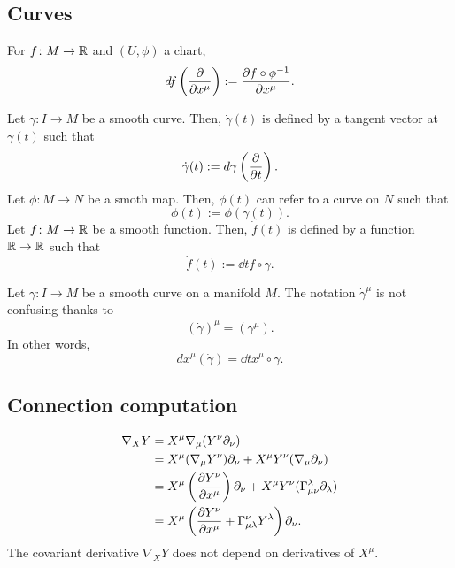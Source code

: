 \documentclass[11pt]{article}
\begin{document}
\subsection{Curves}

\begin{defn}
For $f\colon M\to\R$ and $(U,\phi)$ a chart,
\[df\left(\pd{x^\mu}\right):=\pd{f\circ\phi^{-1}}{x^\mu}.\]
\end{defn}



\begin{defn}
Let $\gamma\colon I\to M$ be a smooth curve.
Then, $\dot\gamma(t)$ is defined by a tangent vector at $\gamma(t)$ such that
\[\dot\gamma(t):=d\gamma\left(\pd{t}\right).\]
Let $\phi\colon M\to N$ be a smoth map.
Then, $\phi(t)$ can refer to a curve on $N$ such that
\[\phi(t):=\phi(\gamma(t)).\]
Let $f\colon M\to\R$ be a smooth function.
Then, $\dot f(t)$ is defined by a function $\R\to\R$ such that
\[\dot f(t):=\dd{t}f\circ\gamma.\]
\end{defn}

\begin{prop}
Let $\gamma\colon I\to M$ be a smooth curve on a manifold $M$.
The notation $\dot\gamma^\mu$ is not confusing thanks to
\[(\dot\gamma)^\mu=\dot{(\gamma^\mu)}.\]
In other words,
\[dx^\mu(\dot\gamma)=\dd{t}x^\mu\circ\gamma.\]
\end{prop}


\subsection{Connection computation}

\begin{align*}
\nabla_XY&=X^\mu\nabla_\mu(Y^\nu\pd_\nu)\\
&=X^\mu(\nabla_\mu Y^\nu)\pd_\nu+X^\mu Y^\nu(\nabla_\mu\pd_\nu)\\
&=X^\mu\left(\pd{Y^\nu}{x^\mu}\right)\pd_\nu+X^\mu Y^\nu(\Gamma_{\mu\nu}^\lambda\pd_\lambda)\\
&=X^\mu\left(\pd{Y^\nu}{x^\mu}+\Gamma_{\mu\lambda}^\nu Y^\lambda\right)\pd_\nu.
\end{align*}
The covariant derivative $\nabla_XY$ does not depend on derivatives of $X^\mu$.
\end{document}
